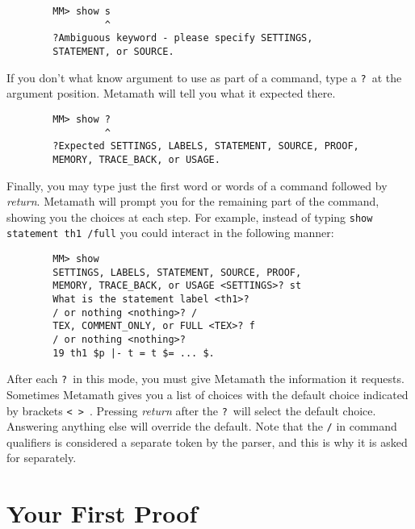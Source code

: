 \begin{verbatim}
        MM> show s
                 ^
        ?Ambiguous keyword - please specify SETTINGS,
        STATEMENT, or SOURCE.
\end{verbatim}

If you don't what know argument to use as part of a command, type a
\texttt{?}\index{\texttt{]}@\texttt{?}\ in command lines}\ at the
argument position.  Metamath will tell you what it expected there.

\begin{verbatim}
        MM> show ?
                 ^
        ?Expected SETTINGS, LABELS, STATEMENT, SOURCE, PROOF,
        MEMORY, TRACE_BACK, or USAGE.
\end{verbatim}

Finally, you may type just the first word or words of a command followed
by {\em return}.  Metamath will prompt you for the remaining part of the
command, showing you the choices at each step.  For example, instead of
typing \texttt{show statement th1 /full} you could interact in the
following manner:
\begin{verbatim}
        MM> show
        SETTINGS, LABELS, STATEMENT, SOURCE, PROOF,
        MEMORY, TRACE_BACK, or USAGE <SETTINGS>? st
        What is the statement label <th1>?
        / or nothing <nothing>? /
        TEX, COMMENT_ONLY, or FULL <TEX>? f
        / or nothing <nothing>?
        19 th1 $p |- t = t $= ... $.
\end{verbatim}
After each \texttt{?}\ in this mode, you must give Metamath the
information it requests.  Sometimes Metamath gives you a list of choices
with the default choice indicated by brackets \texttt{< > }. Pressing
{\em return} after the \texttt{?}\ will select the default choice.
Answering anything else will override the default.  Note that the
\texttt{/} in command qualifiers is considered a separate
token by the parser, and this is why it is asked for
separately.

\section{Your First Proof}\label{frstprf}


